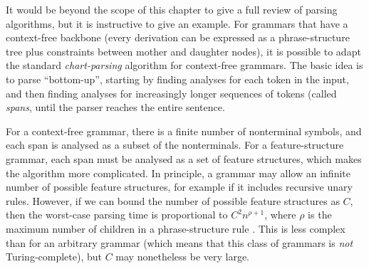 \documentclass[output=paper,nonflat]{langsci/langscibook}
\begin{document}

It would be beyond the scope of this chapter
to give a full review of parsing algorithms,
but it is instructive to give an example.
For grammars that have a context-free backbone
(every derivation can be expressed as a phrase-structure tree
plus constraints between mother and daughter nodes),
it is possible to adapt the standard \textit{chart-parsing} algorithm \cite{kay:1973} for context-free grammars.
The basic idea is to parse ``bottom-up'',
starting by finding analyses for each token in the input,
and then finding analyses for increasingly longer sequences of tokens (called \textit{spans},
until the parser reaches the entire sentence.

For a context-free grammar, there is a finite number of nonterminal symbols,
and each span is analysed as a subset of the nonterminals.
For a feature-structure grammar, each span must be analysed as a set of feature structures,
which makes the algorithm more complicated.
In principle, a grammar may allow an infinite number of possible feature structures,
for example if it includes recursive unary rules.
However, if we can bound the number of possible feature structures as $C$,
then the worst-case parsing time is proportional to $C^2 n^{\rho+1}$,
where $\rho$ is the maximum number of children in a phrase-structure rule
\citep[Section~3.2.3]{carroll1993parse}. 
This is less complex than for an arbitrary grammar
(which means that this class of grammars is \emph{not} Turing-complete),
but $C$ may nonetheless be very large.

\end{document}
